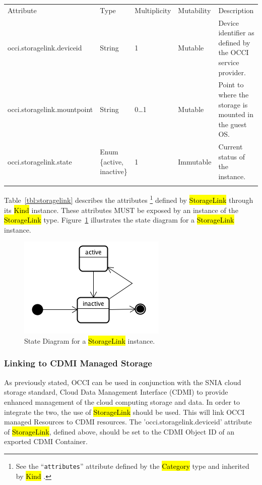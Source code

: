 \documentclass[10pt,a4paper]{article}
\begin{document}
{
	\begin{tabular}{lp{1.8cm}p{1cm}lp{5cm}}
	\toprule
	Attribute&Type&Multi\-plicity&Mutability&Description\\
	\colrule
	occi.storagelink.deviceid & String & 1 & Mutable 
	& Device identifier as defined by the OCCI service provider.\\
	occi.storagelink.mountpoint & String & 0\ldots1 & Mutable 
	& Point to where the storage is mounted in the guest OS.\\
	occi.storagelink.state & Enum \{active, inactive\}& 1 
	& Immutable & Current status of the instance.\\
	\botrule
	\end{tabular}
}

Table~\ref{tbl:storagelink} describes the attributes%
\footnote{See the ``{\tt attributes}'' attribute defined by the \hl{Category}
type and inherited by \hl{Kind} \cite{occi:core}.} 
defined by \hl{StorageLink} through its \hl{Kind} instance. These attributes
MUST be exposed by an instance of the \hl{StorageLink} type. 
Figure~\ref{fig:storagelink_state} illustrates the state diagram for a \hl{StorageLink} instance.

\begin{figure}[!h]
	\centering
	\includegraphics[scale=0.4]{figs/infra-link-state.png}
	\caption{State Diagram for a \hl{StorageLink} instance.}
	\label{fig:storagelink_state}
\end{figure}

\subsubsection{Linking to CDMI Managed Storage}
As previously stated, OCCI can be used in conjunction with the SNIA cloud storage standard, 
Cloud Data Management Interface (CDMI) \cite{cdmi} to provide enhanced management 
of the cloud computing storage and data. In order to integrate the two, the use of \hl{StorageLink}
should be used. This will link OCCI managed Resources to CDMI resources. The 
'occi.storagelink.deviceid' attribute of \hl{StorageLink}, defined above, should be set to the CDMI 
Object ID of an exported CDMI Container.
\end{document}

